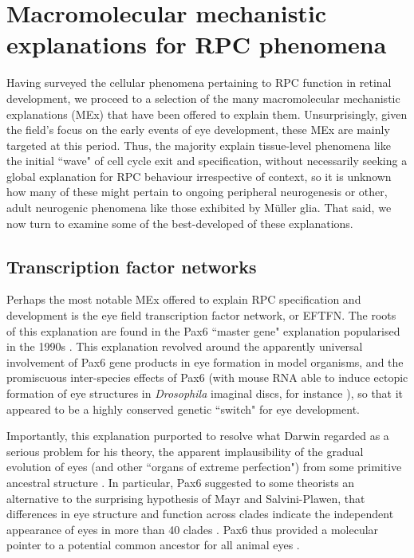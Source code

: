 \section{Macromolecular mechanistic explanations for RPC phenomena}

Having surveyed the cellular phenomena pertaining to RPC function in retinal development, we proceed to a selection of the many macromolecular mechanistic explanations (MEx) \cite{Fagan2012} that have been offered to explain them. Unsurprisingly, given the field's focus on the early events of eye development, these MEx are mainly targeted at this period. Thus, the majority explain tissue-level phenomena like the initial ``wave" of cell cycle exit and specification, without necessarily seeking a global explanation for RPC behaviour irrespective of context, so it is unknown how many of these might pertain to ongoing peripheral neurogenesis or other, adult neurogenic phenomena like those exhibited by M{\"u}ller glia. That said, we now turn to examine some of the best-developed of these explanations.

\subsection{Transcription factor networks}

Perhaps the most notable MEx offered to explain RPC specification and development is the eye field transcription factor network, or EFTFN. The roots of this explanation are found in the Pax6 ``master gene" explanation popularised in the 1990s \cite{Gehring1996}. This explanation revolved around the apparently universal involvement of Pax6 gene products in eye formation in model organisms, and the promiscuous inter-species effects of Pax6 (with mouse RNA able to induce ectopic formation of eye structures in \textit{Drosophila} imaginal discs, for instance \cite{Halder1995}), so that it appeared to be a highly conserved genetic ``switch" for eye development.

Importantly, this explanation purported to resolve what Darwin regarded as a serious problem for his theory, the apparent implausibility of the gradual evolution of eyes (and other ``organs of extreme perfection") from some primitive ancestral structure \cite[p.143-4]{Darwin1888}. In particular, Pax6 suggested to some theorists an alternative to the surprising hypothesis of Mayr and Salvini-Plawen, that differences in eye structure and function across clades indicate the independent appearance of eyes in more than 40 clades \cite{v.Salvini-Plawen1977}. Pax6 thus provided a molecular pointer to a potential common ancestor for all animal eyes \cite{Erclik2009}.

